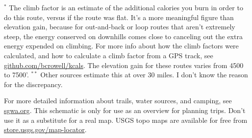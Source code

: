 \documentclass{san-g}
\begin{document}
${}^*$ \scriptsize{The climb factor is an estimate of the additional calories you burn
in order to do this route, versus if the route was flat.
It's a more meaningful figure than elevation gain, because for
out-and-back or loop routes that aren't extremely steep, the energy conserved on
downhills comes close to canceling out the extra energy expended on climbing. For more
info about how the climb factors were calculated, and how to calculate
a climb factor from a GPS track, see \url{github.com/bcrowell/kcals}. The elevation gain for
these routes varies from 4500 to 7500'.
}
${}^{**}$ \scriptsize{Other sources estimate this at over 30 miles. I don't know the reason
for the discrepancy.
}

\vspace{10mm}

\normalsize For more detailed information about trails, water sources, and camping, see \url{sgwa.org}.
This schematic is only for use as an overview for planning trips. Don't use it as a substitute
for a real map. USGS topo maps are available for free from \url{store.usgs.gov/map-locator}.

\vfill

\myfooter
\end{document}
